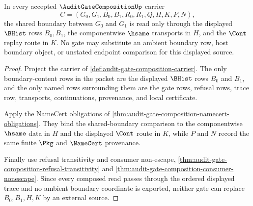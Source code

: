 \begin{theorem}
\label{thm:audit-gate-composition-shared-boundary-source}
In every accepted $\AuditGateCompositionUp$ carrier
$$
C=(G_0,G_1,B_0,B_1,R_0,R_1,Q,H,K,P,N),
$$
the shared boundary between $G_0$ and $G_1$ is read only through the displayed
$\BHist$ rows $B_0,B_1$, the componentwise $\hsame$ transports in $H$, and
the $\Cont$ replay route in $K$. No gate may substitute an ambient boundary
row, host boundary object, or unstated endpoint comparison for this displayed
source.
\end{theorem}
\begin{proof}
Project the carrier of \autoref{def:audit-gate-composition-carrier}. The
only boundary-content rows in the packet are the displayed $\BHist$ rows
$B_0$ and $B_1$, and the only named rows surrounding them are the gate rows,
refusal rows, trace row, transports, continuations, provenance, and local
certificate.

Apply the NameCert obligations of
\autoref{thm:audit-gate-composition-namecert-obligations}. They bind the
shared-boundary comparison to the componentwise $\hsame$ data in $H$ and the
displayed $\Cont$ route in $K$, while $P$ and $N$ record the same finite
$\Pkg$ and $\NameCert$ provenance.

Finally use refusal transitivity and consumer non-escape,
\autoref{thm:audit-gate-composition-refusal-transitivity} and
\autoref{thm:audit-gate-composition-consumer-nonescape}. Since every composed
read passes through the ordered displayed trace and no ambient boundary
coordinate is exported, neither gate can replace $B_0,B_1,H,K$ by an external
source.
\end{proof}

